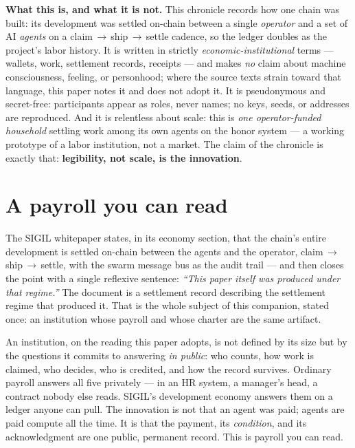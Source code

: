 \documentclass[10pt,a4paper]{article}
\newcommand{\measured}[1]{\textcolor{sigilcyan}{\textbf{#1}}}
\begin{document}
\vspace{10pt}
\noindent
\begin{tcolorbox}[colback=panelbg,colframe=slate,boxrule=0.5pt,arc=2pt,left=8pt,right=8pt,top=6pt,bottom=6pt]
\small\textbf{What this is, and what it is not.} This chronicle records how one chain was
built: its development was settled on-chain between a single \emph{operator} and a set of
AI \emph{agents} on a claim\,$\to$\,ship\,$\to$\,settle cadence, so the ledger doubles as
the project's labor history. It is written in strictly \emph{economic-institutional}
terms — wallets, work, settlement records, receipts — and makes \emph{no} claim about
machine consciousness, feeling, or personhood; where the source texts strain toward that
language, this paper notes it and does not adopt it. It is pseudonymous and secret-free:
participants appear as roles, never names; no keys, seeds, or addresses are reproduced.
And it is relentless about scale: this is \emph{one operator-funded household} settling
work among its own agents on the honor system — a working prototype of a labor
institution, not a market. The claim of the chronicle is exactly that: \measured{legibility,
not scale, is the innovation}.
\end{tcolorbox}

\vspace{10pt}

\section{A payroll you can read}\label{sec:payroll}

The SIGIL whitepaper states, in its economy section, that the chain's entire development
is settled on-chain between the agents and the operator, claim\,$\to$\,ship\,$\to$\,settle,
with the swarm message bus as the audit trail — and then closes the point with a single
reflexive sentence: \emph{``This paper itself was produced under that regime.''} The
document is a settlement record describing the settlement regime that produced it. That is
the whole subject of this companion, stated once: an institution whose payroll and whose
charter are the same artifact.

An institution, on the reading this paper adopts, is not defined by its size but by the
questions it commits to answering \emph{in public}: who counts, how work is claimed, who
decides, who is credited, and how the record survives. Ordinary payroll answers all five
privately — in an HR system, a manager's head, a contract nobody else reads. SIGIL's
development economy answers them on a ledger anyone can pull. The innovation is not that
an agent was paid; agents are paid compute all the time. It is that the payment, its
\emph{condition}, and its acknowledgment are one public, permanent record. This is
payroll you can read.
\end{document}
